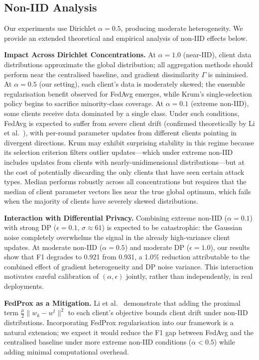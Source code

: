 \documentclass[conference]{IEEEtran}
\begin{document}
\subsection{Non-IID Analysis}
\label{subsec:noniid}

Our experiments use Dirichlet $\alpha=0.5$, producing moderate
heterogeneity.
We provide an extended theoretical and empirical analysis of non-IID
effects below.

\textbf{Impact Across Dirichlet Concentrations.}
At $\alpha=1.0$ (near-IID), client data distributions approximate
the global distribution; all aggregation methods should perform near
the centralised baseline, and gradient dissimilarity $\Gamma$ is
minimised.
At $\alpha=0.5$ (our setting), each client's data is moderately
skewed; the ensemble regularisation benefit observed for FedAvg
emerges, while Krum's single-selection policy begins to sacrifice
minority-class coverage.
At $\alpha=0.1$ (extreme non-IID), some clients receive data dominated
by a single class.
Under such conditions, FedAvg is expected to suffer from severe client
drift (confirmed theoretically by Li et al.~\cite{li2020convergence}),
with per-round parameter updates from different clients pointing in
divergent directions.
Krum may exhibit surprising stability in this regime because its
selection criterion filters outlier updates---which under extreme
non-IID includes updates from clients with nearly-unidimensional
distributions---but at the cost of potentially discarding the only
clients that have seen certain attack types.
Median performs robustly across all concentrations but requires that
the median of client parameter vectors lies near the true global
optimum, which fails when the majority of clients have severely skewed
distributions.

\textbf{Interaction with Differential Privacy.}
Combining extreme non-IID ($\alpha=0.1$) with strong DP
($\epsilon=0.1$, $\sigma \approx 61$) is expected to be catastrophic:
the Gaussian noise completely overwhelms the signal in the already
high-variance client updates.
At moderate non-IID ($\alpha=0.5$) and moderate DP ($\epsilon=1.0$),
our results show that F1 degrades to 0.921 from 0.931, a 1.0\%
reduction attributable to the combined effect of gradient heterogeneity
and DP noise variance.
This interaction motivates careful calibration of $(\alpha, \epsilon)$
jointly, rather than independently, in real deployments.

\textbf{FedProx as a Mitigation.}
Li et al.~\cite{li2020fedprox} demonstrate that adding the proximal
term $\frac{\mu}{2}\|w_k - w^t\|^2$ to each client's objective
bounds client drift under non-IID distributions.
Incorporating FedProx regularisation into our framework is a natural
extension; we expect it would reduce the F1 gap between FedAvg and the
centralised baseline under more extreme non-IID conditions
($\alpha < 0.5$) while adding minimal computational overhead.
\end{document}
